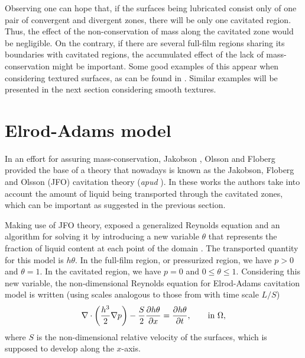 Observing  one can hope that, if the surfaces being lubricated consist only of one pair of convergent and divergent zones, there will be only one cavitated region. Thus, the effect of the non-conservation of mass along the cavitated zone would be negligible. On the contrary, if there are several full-film regions sharing its boundaries with cavitated regions, the accumulated effect of the lack of mass-conservation might be important. Some good examples of this appear when considering textured surfaces, as can be found in \cite{ausas07}. Similar examples will be presented in the next section considering smooth textures.
\section{Elrod-Adams model}\label{sec:elrod_adams_model}
In an effort for assuring mass-conservation, Jakobson \cite{jakobson1}, Olsson \cite{olsson1} and Floberg \cite{floberg73,floberg74} provided the base of a theory that nowadays is known as the Jakobson, Floberg and Olsson (JFO) cavitation theory (\emph{apud} \cite{braun2010}). In these works the authors take into account the amount of liquid being transported through the cavitated zones, which can be important as suggested in the previous section.

Making use of JFO theory, \citeauthor{elrod1974} \cite{elrod1974} exposed a generalized Reynolds equation and an algorithm for solving it by introducing a new variable $\theta$ that represents the fraction of liquid content at each point of the domain \cite{braun2010}. The transported quantity for this model is $h\theta$. In the full-film region, or pressurized region, we have $p>0$ and $\theta=1$. In the cavitated region, we have $p=0$ and $0\leq \theta \leq 1$. Considering this new variable, the non-dimensional Reynolds equation for Elrod-Adams cavitation model is written (using scales analogous to those from  with time scale $L/S$)
\begin{equation}
\nabla \cdot \left( \frac{h^3}{2}\nabla p \right) -\frac{S}{2}\frac{\partial h\theta}{\partial x} = \frac{\partial h\theta}{\partial t} ,\qquad\text{in }\Omega,
\end{equation}
where $S$ is the non-dimensional relative velocity of the surfaces, which is supposed to develop along the $x$-axis.


